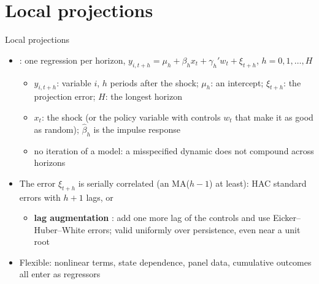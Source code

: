 \section{Local projections}

\begin{frame}{Local projections}
\itemsize{\small}
\begin{itemize}
    \item {}: one regression per horizon, $y_{i,t+h} = \mu_h + \beta_hx_t + \gamma_h'w_t + \xi_{t+h}$, $h = 0, 1, \dots, H$
    \begin{itemize}
        \item $y_{i,t+h}$: variable $i$, $h$ periods after the shock; $\mu_h$: an intercept; $\xi_{t+h}$: the projection error; $H$: the longest horizon
        \item $x_t$: the shock (or the policy variable with controls $w_t$ that make it as good as random); $\hat\beta_h$ is the impulse response
        \item no iteration of a model: a misspecified dynamic does not compound across horizons
    \end{itemize}
    \item The error $\xi_{t+h}$ is serially correlated (an MA($h - 1$) at least): HAC standard errors with $h + 1$ lags, or
    \begin{itemize}
        \item \textbf{lag augmentation} : add one more lag of the controls and use Eicker--Huber--White errors; valid uniformly over persistence, even near a unit root
    \end{itemize}
    \item Flexible: nonlinear terms, state dependence, panel data, cumulative outcomes all enter as regressors
\end{itemize}
\end{frame}

